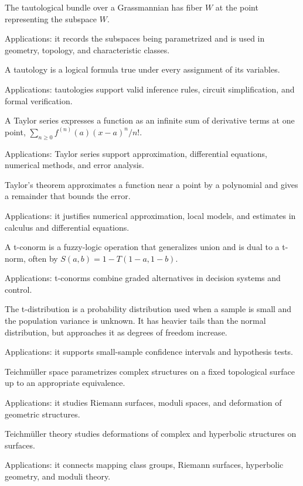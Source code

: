 The tautological bundle over a Grassmannian has fiber $W$ at the point representing the subspace $W$. \par\noindent Applications: it records the subspaces being parametrized and is used in geometry, topology, and characteristic classes.

A tautology is a logical formula true under every assignment of its variables. \par\noindent Applications: tautologies support valid inference rules, circuit simplification, and formal verification.

A Taylor series expresses a function as an infinite sum of derivative terms at one point, $\sum_{n\ge0}f^{(n)}(a)(x-a)^n/n!$. \par\noindent Applications: Taylor series support approximation, differential equations, numerical methods, and error analysis.

Taylor's theorem approximates a function near a point by a polynomial and gives a remainder that bounds the error. \par\noindent Applications: it justifies numerical approximation, local models, and estimates in calculus and differential equations.

A t-conorm is a fuzzy-logic operation that generalizes union and is dual to a t-norm, often by $S(a,b)=1-T(1-a,1-b)$. \par\noindent Applications: t-conorms combine graded alternatives in decision systems and control.

The t-distribution is a probability distribution used when a sample is small and the population variance is unknown. It has heavier tails than the normal distribution, but approaches it as degrees of freedom increase. \par\noindent Applications: it supports small-sample confidence intervals and hypothesis tests.

Teichmüller space parametrizes complex structures on a fixed topological surface up to an appropriate equivalence. \par\noindent Applications: it studies Riemann surfaces, moduli spaces, and deformation of geometric structures.

Teichmüller theory studies deformations of complex and hyperbolic structures on surfaces. \par\noindent Applications: it connects mapping class groups, Riemann surfaces, hyperbolic geometry, and moduli theory.

